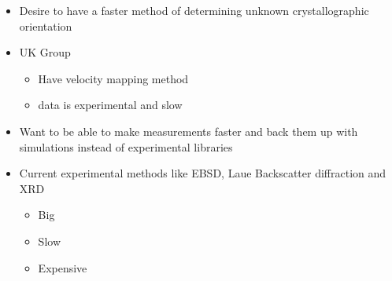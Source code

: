 
\begin{itemize}
\item Desire to have a faster method of determining unknown crystallographic orientation
\item UK Group 
\begin{itemize}
\item Have velocity mapping method 
\item data is experimental and slow
\end{itemize}
\item Want to be able to make measurements faster and back them up with simulations instead of experimental libraries
\item Current experimental methods like EBSD, Laue Backscatter diffraction and XRD
\begin{itemize}
\item Big
\item Slow
\item Expensive
\end{itemize}
\end{itemize}